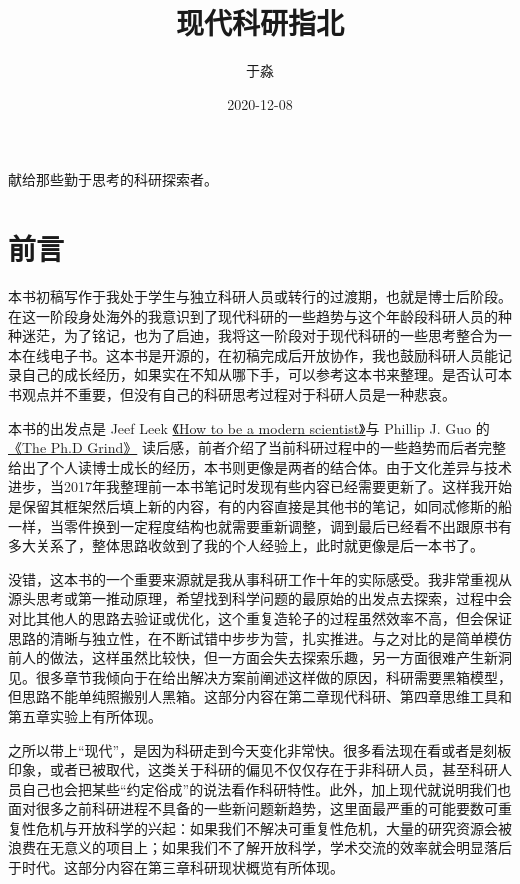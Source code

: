 \documentclass[]{tufte-book}
\title{现代科研指北}
\author{于淼}
\date{2020-12-08}
\begin{document}
\maketitle



{
\setcounter{tocdepth}{1}
\tableofcontents
}

献给那些勤于思考的科研探索者。

\hypertarget{ux524dux8a00}{%
\chapter{前言}\label{ux524dux8a00}}

本书初稿写作于我处于学生与独立科研人员或转行的过渡期，也就是博士后阶段。在这一阶段身处海外的我意识到了现代科研的一些趋势与这个年龄段科研人员的种种迷茫，为了铭记，也为了启迪，我将这一阶段对于现代科研的一些思考整合为一本在线电子书。这本书是开源的，在初稿完成后开放协作，我也鼓励科研人员能记录自己的成长经历，如果实在不知从哪下手，可以参考这本书来整理。是否认可本书观点并不重要，但没有自己的科研思考过程对于科研人员是一种悲哀。

本书的出发点是 Jeef Leek \href{https://leanpub.com/modernscientist}{《How to be a modern scientist》}与 Phillip J. Guo 的\href{https://www.goodreads.com/en/book/show/15731248-the-ph-d-grind}{《The Ph.D Grind》} 读后感，前者介绍了当前科研过程中的一些趋势而后者完整给出了个人读博士成长的经历，本书则更像是两者的结合体。由于文化差异与技术进步，当2017年我整理前一本书笔记时发现有些内容已经需要更新了。这样我开始是保留其框架然后填上新的内容，有的内容直接是其他书的笔记，如同忒修斯的船一样，当零件换到一定程度结构也就需要重新调整，调到最后已经看不出跟原书有多大关系了，整体思路收敛到了我的个人经验上，此时就更像是后一本书了。

没错，这本书的一个重要来源就是我从事科研工作十年的实际感受。我非常重视从源头思考或第一推动原理，希望找到科学问题的最原始的出发点去探索，过程中会对比其他人的思路去验证或优化，这个重复造轮子的过程虽然效率不高，但会保证思路的清晰与独立性，在不断试错中步步为营，扎实推进。与之对比的是简单模仿前人的做法，这样虽然比较快，但一方面会失去探索乐趣，另一方面很难产生新洞见。很多章节我倾向于在给出解决方案前阐述这样做的原因，科研需要黑箱模型，但思路不能单纯照搬别人黑箱。这部分内容在第二章现代科研、第四章思维工具和第五章实验上有所体现。

之所以带上``现代''，是因为科研走到今天变化非常快。很多看法现在看或者是刻板印象，或者已被取代，这类关于科研的偏见不仅仅存在于非科研人员，甚至科研人员自己也会把某些``约定俗成''的说法看作科研特性。此外，加上现代就说明我们也面对很多之前科研进程不具备的一些新问题新趋势，这里面最严重的可能要数可重复性危机与开放科学的兴起：如果我们不解决可重复性危机，大量的研究资源会被浪费在无意义的项目上；如果我们不了解开放科学，学术交流的效率就会明显落后于时代。这部分内容在第三章科研现状概览有所体现。
\end{document}
